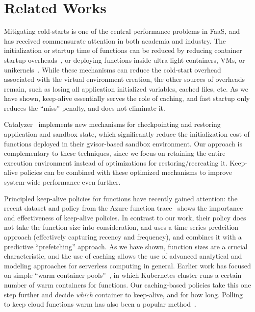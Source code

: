 \section{Related Works}
\label{sec:faascache-related}


Mitigating cold-starts is one of the central performance problems in FaaS, and has received commensurate attention in both academia and industry.
%
The initialization or startup time of functions can be reduced  by reducing container startup overheads~\cite{oakes_sock_2018,mohan_agile_2019, akkus_sand_2018}, or deploying functions inside ultra-light containers, VMs, or unikernels~\cite{unikernels,firecracker-nsdi20}.
%
While these mechanisms can reduce the cold-start overhead associated with the virtual environment creation, the other sources of overheads remain, such as losing all application initialized variables, cached files, etc.
As we have shown, keep-alive essentially serves the role of caching, and fast startup only reduces the ``miss'' penalty, and does not eliminate it.

Catalyzer~\cite{du2020catalyzer} implements new mechanisms for checkpointing and restoring application and sandbox state, which significantly reduce the initialization cost of functions deployed in their gvisor-based sandbox environment. 
Our approach is complementary to these techniques, since we focus on retaining the entire execution environment instead of optimizations for restoring/recreating it. 
Keep-alive policies can be combined with these optimized mechanisms to improve system-wide performance even further. 


Principled keep-alive policies for functions have recently gained attention: the recent dataset and policy from the Azure function trace~\cite{shahrad_serverless_2020} shows the importance and effectiveness of keep-alive policies. 
In contrast to our work, their policy does not take the function size into consideration, and uses a time-series predcition approach (effectively capturing recency and frequency), and combines it with a predictive ``prefetching'' approach. 
As we have shown, function sizes are a crucial characteristic, and the use of caching allows the use of advanced analytical and modeling approaches for serverless computing in general. 
Earlier work has focused on simple ``warm container pools''~\cite{lin_mitigating_2019}, in which Kubernetes cluster runs a certain number of warm containers for functions. 
Our caching-based policies take this one step further and decide \emph{which} container to keep-alive, and for how long. 
Polling to keep cloud functions warm has also been a popular method~\cite{warm2,warm1}.




